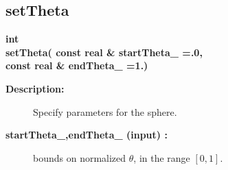 \subsection{setTheta}
 
\begin{flushleft} \textbf{%
int  \\ 
\settowidth{\SphereMappingIncludeArgIndent}{setTheta(}%
setTheta( const real \& startTheta\_  =.0,\\ 
\hspace{\SphereMappingIncludeArgIndent}const real \& endTheta\_    =1.)
}\end{flushleft}
\begin{description}
\item[{\bf Description:}]  
    Specify parameters for the sphere.
\item[{\bf startTheta\_,endTheta\_ (input) :}]  bounds on normalized $\theta$, in the range $[0,1]$.
\end{description}
